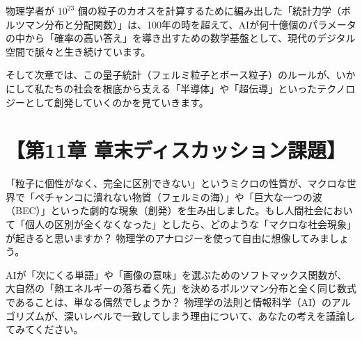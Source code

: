 物理学者が \ensuremath{10^{23}} 個の粒子のカオスを計算するために編み出した「統計力学（ボルツマン分布と分配関数）」は、100年の時を超えて、AIが何十億個のパラメータの中から「確率の高い答え」を導き出すための数学基盤として、現代のデジタル空間で脈々と生き続けています。

そして次章では、この量子統計（フェルミ粒子とボース粒子）のルールが、いかにして私たちの社会を根底から支える「半導体」や「超伝導」といったテクノロジーとして創発していくのかを見ていきます。

\section*{【第11章 章末ディスカッション課題】}

「粒子に個性がなく、完全に区別できない」というミクロの性質が、マクロな世界で「ペチャンコに潰れない物質（フェルミの海）」や「巨大な一つの波（BEC）」といった劇的な現象（創発）を生み出しました。もし人間社会において「個人の区別が全くなくなった」としたら、どのような「マクロな社会現象」が起きると思いますか？ 物理学のアナロジーを使って自由に想像してみましょう。

AIが「次にくる単語」や「画像の意味」を選ぶためのソフトマックス関数が、大自然の「熱エネルギーの落ち着く先」を決めるボルツマン分布と全く同じ数式であることは、単なる偶然でしょうか？ 物理学の法則と情報科学（AI）のアルゴリズムが、深いレベルで一致してしまう理由について、あなたの考えを議論してみてください。





